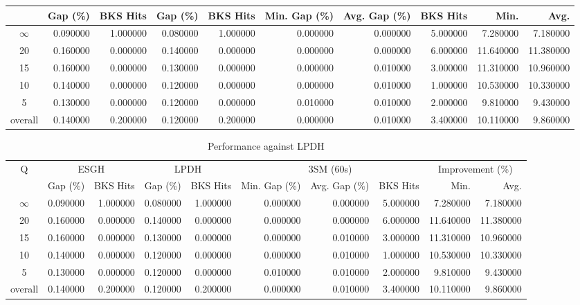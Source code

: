 \begin{table}[H]
\begin{tabular}{c rr rr rrr rr}
 & Gap (\%) & BKS Hits & Gap (\%) & BKS Hits & Min. Gap (\%) & Avg. Gap (\%) & BKS Hits & Min. & Avg. \\
\midrule
$\infty$ & 0.090000 & 1.000000 & 0.080000 & 1.000000 & 0.000000 & 0.000000 & 5.000000 & 7.280000 & 7.180000 \\
20 & 0.160000 & 0.000000 & 0.140000 & 0.000000 & 0.000000 & 0.000000 & 6.000000 & 11.640000 & 11.380000 \\
15 & 0.160000 & 0.000000 & 0.130000 & 0.000000 & 0.000000 & 0.010000 & 3.000000 & 11.310000 & 10.960000 \\
10 & 0.140000 & 0.000000 & 0.120000 & 0.000000 & 0.000000 & 0.010000 & 1.000000 & 10.530000 & 10.330000 \\
5 & 0.130000 & 0.000000 & 0.120000 & 0.000000 & 0.010000 & 0.010000 & 2.000000 & 9.810000 & 9.430000 \\
\midrule
overall & 0.140000 & 0.200000 & 0.120000 & 0.200000 & 0.000000 & 0.010000 & 3.400000 & 10.110000 & 9.860000 \\
\bottomrule
\end{tabular}
\end{table}\begin{table}[H]
\caption{Performance against LPDH}
\label{tab:3lm_resuts_kritikos2}
\begin{tabular}{c rr rr rrr rr}
\toprule
Q & \multicolumn{2}{c}{ESGH} & \multicolumn{2}{c}{LPDH} & \multicolumn{3}{c}{3SM (60s)} & \multicolumn{2}{c}{Improvement (\%)} \\
 & Gap (\%) & BKS Hits & Gap (\%) & BKS Hits & Min. Gap (\%) & Avg. Gap (\%) & BKS Hits & Min. & Avg. \\
\midrule
$\infty$ & 0.090000 & 1.000000 & 0.080000 & 1.000000 & 0.000000 & 0.000000 & 5.000000 & 7.280000 & 7.180000 \\
20 & 0.160000 & 0.000000 & 0.140000 & 0.000000 & 0.000000 & 0.000000 & 6.000000 & 11.640000 & 11.380000 \\
15 & 0.160000 & 0.000000 & 0.130000 & 0.000000 & 0.000000 & 0.010000 & 3.000000 & 11.310000 & 10.960000 \\
10 & 0.140000 & 0.000000 & 0.120000 & 0.000000 & 0.000000 & 0.010000 & 1.000000 & 10.530000 & 10.330000 \\
5 & 0.130000 & 0.000000 & 0.120000 & 0.000000 & 0.010000 & 0.010000 & 2.000000 & 9.810000 & 9.430000 \\
\midrule
overall & 0.140000 & 0.200000 & 0.120000 & 0.200000 & 0.000000 & 0.010000 & 3.400000 & 10.110000 & 9.860000 \\
\bottomrule

\end{tabular}
\end{table}
